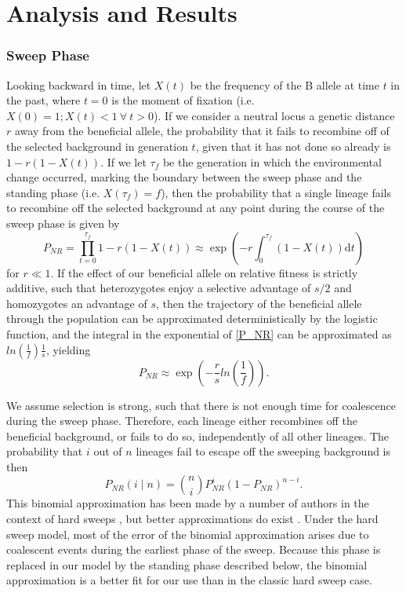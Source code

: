\documentclass[a4paper,10pt]{article}
\begin{document}
\section{Analysis and Results}

\subsubsection*{Sweep Phase}

Looking backward in time, let $X\left(t\right)$ be the frequency of the B allele at time $t$ in the past, where $t=0$ is the moment of fixation (i.e. $X\left(0\right) = 1; X\left(t\right) < 1\ \forall\ t > 0$). If we consider a neutral locus a genetic distance $r$ away from the beneficial allele, the probability that it fails to recombine off of the selected background in generation $t$, given that it has not done so already is $1-r\left(1-X(t)\right)$. If we let $\tau_{f}$ be the generation in which the environmental change occurred, marking the boundary between the sweep phase and the standing phase (i.e. $X\left(\tau_{f}\right) = f$), then the probability that a single lineage fails to recombine off the selected background at any point during the course of the sweep phase is given by
\begin{equation}
P_{NR} = \prod_{t=0}^{\tau_{f}} 1-r\left(1-X(t)\right)  \approx \exp \left(-r \int_0^{\tau_{f}}(1-X\left(t\right))\mathrm{d} t \right) \label{P_NR}
\end{equation}
for $r \ll 1$. If the effect of our beneficial allele on relative fitness is strictly additive, such that heterozygotes enjoy a selective advantage of $s/2$ and homozygotes an advantage of $s$, then the trajectory of the beneficial allele through the population can be approximated deterministically by the logistic function, and the integral in the exponential of \eqref{P_NR} can be approximated as $ln\left(\frac{1}{f}\right) \frac{1}{s}$, yielding
\begin{equation}
	P_{NR} \approx \exp \left(-\frac{r}{s}ln\left(\frac{1}{f}\right)\right).
\end{equation}

We assume selection is strong, such that there is not enough time for coalescence during the sweep phase. Therefore, each lineage either recombines off the beneficial background, or fails to do so, independently of all other lineages. The probability that $i$ out of $n$ lineages fail to escape off the sweeping background is then
\begin{equation}
P_{NR}(i \mid n) = {n \choose i} P_{NR}^{i} (1-P_{NR})^{n-i}.
\end{equation}
This binomial approximation has been made by a number of authors in the context of hard sweeps \citep[e.g. ][]{Smith1974,Fay:2000us,McVean:2006ke}, but better approximations do exist \citep{Barton1998,Durrett:2004fl,Durrett:2005fr,Schweinsberg:2005eh,Etheridge:2006fk,Messer:2012ie}. Under the hard sweep model, most of the error of the binomial approximation arises due to coalescent events during the earliest phase of the sweep. Because this phase is replaced in our model by the standing phase described below, the binomial approximation is a better fit for our use than in the classic hard sweep case. 
\end{document}
